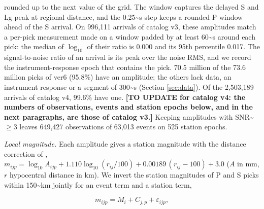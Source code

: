 \documentclass[review]{seismica}
\begin{document}
rounded up to the next value of the grid. The window captures the
delayed S and Lg peak at regional distance, and the
0.25\textasciitilde s step keeps a rounded P window ahead of the S
arrival. On 996,111 arrivals of catalog v3, these amplitudes match a
per-pick measurement made on a window padded by at least
60\textasciitilde s around each pick: the median of \(\log_{10}\) of
their ratio is 0.000 and its 95th percentile 0.017. The signal-to-noise
ratio of an arrival is its peak over the noise RMS, and we record the
instrument-response epoch that contains the pick. 70.5 million of the
73.6 million picks of ver6 (95.8\%) have an amplitude; the others lack
data, an instrument response or a segment of 300\textasciitilde s
(Section \ref{sec:data}). Of the 2,503,189 arrivals of catalog v4,
99.6\% have one. \textbf{{[}TO UPDATE for catalog v4: the numbers of
observations, events and station epochs below, and in the next
paragraphs, are those of catalog v3.{]}} Keeping amplitudes with
SNR\textasciitilde{}\(\ge3\) leaves 649,427 observations of 63,013
events on 525 station epochs.

\emph{Local magnitude.} Each amplitude gives a station magnitude with
the distance correction of \citet{Hutton87},
\(m_{ijp}=\log_{10}A_{ijp}+1.110\log_{10}(r_{ij}/100)+0.00189\,(r_{ij}-100)+3.0\)
(\(A\) in mm, \(r\) hypocentral distance in km). We invert the station
magnitudes of P and S picks within 150\textasciitilde km jointly for an
event term and a station term,

\begin{equation}
m_{ijp} = M_i + C_{j,p} + \varepsilon_{ijp},
\end{equation}
\end{document}
